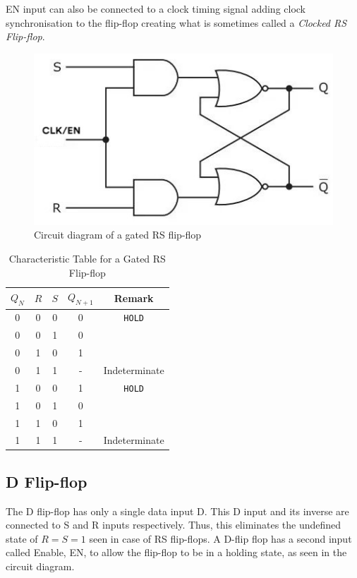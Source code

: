 EN input can also be connected to a clock timing signal adding
clock synchronisation to the flip-flop creating what is sometimes called a
\textit{Clocked RS Flip-flop}.

\begin{figure}[H]
    \centering
    \includegraphics[width=0.60\columnwidth]{images/gatedrs.jpg}
    \caption{Circuit diagram of a gated RS flip-flop}
    \label{2}
\end{figure}

\begin{table}[H]
    \centering
    \begin{tabular}{|c|c|c|c|c|}\hline
        $Q_N$ & $R$ & $S$ & $Q_{N+1}$ & Remark \\ \hline
        0 & 0 & 0 & 0 & \verb|HOLD| \\ 
        0 & 0 & 1 & 0 & \\ 
        0 & 1 & 0 & 1 &\\ 
        0 & 1 & 1 & - &Indeterminate \\ 
        1 & 0 & 0 & 1 &\verb|HOLD|\\ 
        1 & 0 & 1 & 0 &\\ 
        1 & 1 & 0 & 1 &\\
        1 & 1 & 1 & - & Indeterminate \\ \hline
    \end{tabular}
    \caption{Characteristic Table for a Gated RS Flip-flop}
\end{table}
\subsection{D Flip-flop}
The D flip-flop has only a single data input D. This D input and its inverse are connected to S and R inputs respectively. Thus, this eliminates the undefined state of $R=S=1$ seen in case of RS flip-flops.
A D-flip flop has a second input called Enable, EN, to allow the flip-flop to
be in a holding state, as seen in the circuit diagram.


